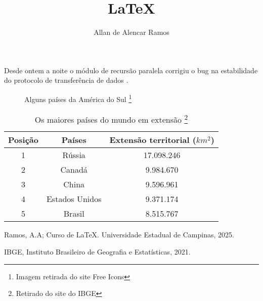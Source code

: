\documentclass[12pt, a4paper, oneside]{book}
\begin{document}
\title{LaTeX}
\author{Allan de Alencar Ramos}
\maketitle

Desde ontem a noite o módulo de recursão paralela corrigiu o bug na estabilidade do protocolo de transferência de dados \cite{Allan}.

\begin{figure}[h]
\centering
{}
\caption{Alguns países da América do Sul \cite{Allan}\footnote{Imagem retirada do site Free Icons}}\label{FigSouthAmerica}

\end{figure}

\begin{table}[h]\label{TabMaioresPaisesEmExtensao}
\centering
\caption{Os maiores países do mundo em extensão \cite{IBGE}\footnote{Retirado do site do IBGE}}
\vspace{0.5cm}
\begin{tabular}{ c | cc |}
	Posição & Países & Extensão territorial ($km^{2}$) \\ \hline
	1 & Rússia 			& 17.098.246 \\
	2 & Canadá 			& 9.984.670 \\
	3 & China 			& 9.596.961 \\
	4 & Estados Unidos 	& 9.371.174 \\
	5 & Brasil 			& 8.515.767 \\

\end{tabular}

\end{table}

\begin{thebibliography}{2}
 Ramos, A.A; Curso de LaTeX. Universidade Estadual de Campinas, 2025.

 IBGE, Instituto Brasileiro de Geografia e Estatísticas, 2021.
\end{thebibliography}
\end{document}

